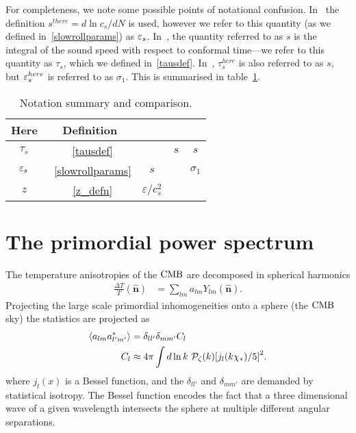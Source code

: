     For completeness, we note some possible points of notational confusion.
    In~\cite{px_burrage} the definition $s^{there}=d\ln c_s/dN$ is used, however we refer to this
    quantity (as we defined in~\eqref{slowrollparams}) as $\varepsilon_{s}$.
    In~\cite{Hu_2011}, the quantity referred to as $s$ is the integral of the sound speed
    with respect to conformal time---we refer to this quantity as $\tau_s$,
    which we defined in~\eqref{tausdef}.
    In~\cite{warp_features_dbi}, $\tau_s^{here}$ is also referred to as $s$,
    but $\varepsilon_{s}^{here}$ is referred to as $\sigma_1$.
    This is summarised in table~\ref{tab:notation}.


\begin{table}[h!]
  \begin{center}
    \begin{tabular}{ccccc}
        \toprule
        Here & Definition &~\cite{px_burrage}&~\cite{Hu_2011} &~\cite{warp_features_dbi}\\
        \midrule
        $\tau_s$ &~\eqref{tausdef} & ~ & $s$ & $s$ \\
        $\varepsilon_{s}$ &~\eqref{slowrollparams} & $s$ & ~ & $\sigma_1$ \\
        $z$ &~\eqref{z_defn} & $\varepsilon/c_s^2$ & ~ & ~ \\
        \bottomrule
    \end{tabular}
    \caption{
        Notation summary and comparison.
    }\label{tab:notation}
  \end{center}
\end{table}


    \section{The primordial power spectrum}
    The temperature anisotropies of the $\text{CMB}$ are decomposed in spherical
    harmonics
    \begin{align}
        \frac{\Delta T}{T}(\hat{\mathbf{n}}) &= \sum_{lm} a_{lm}Y_{lm}(\hat{\mathbf{n}}).
    \end{align}
    Projecting the large scale primordial inhomogeneities onto a sphere (the $\text{CMB}$ sky)
    the statistics are projected as
    \begin{align}
        \left<a_{lm}a^*_{l'm'}\right> &= \delta_{ll'}\delta_{mm'}C_l\\
        C_l &\approx 4\pi\int d\ln k~\mathcal{P}_{\mathcal{\zeta}}(k){\left[
            j_l(k\chi_*)/5
            \right]}^2.
    \end{align}
    where $j_l(x)$ is a Bessel function, and the $\delta_{ll'}$ and $\delta_{mm'}$
    are demanded by statistical isotropy. The Bessel function encodes the fact that a three dimensional
    wave of a given wavelength intersects the sphere at multiple different angular separations.


